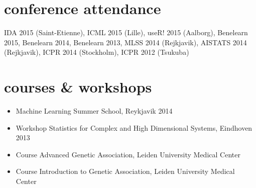 \documentclass[]{friggeri-cv}
\begin{document}
{\section{conference attendance}
IDA 2015 (Saint-Etienne),
ICML 2015 (Lille),
useR! 2015 (Aalborg),
Benelearn 2015,
Benelearn 2014,
Benelearn 2013,
MLSS 2014 (Rejkjavik),
AISTATS 2014 (Rejkjavik),
ICPR 2014 (Stockholm),
ICPR 2012 (Tsukuba)

\section{courses \& workshops}
\begin{itemize}
\item Machine Learning Summer School, Reykjavik 2014
\item Workshop Statistics for Complex and High Dimensional Systems, Eindhoven 2013
\item Course Advanced Genetic Association, Leiden University Medical Center
\item Course Introduction to Genetic Association, Leiden University Medical Center
\end{itemize}
}
\end{document}
